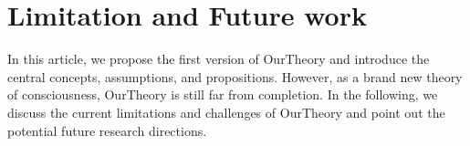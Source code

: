 \documentclass[utf8]{article}
\begin{document}
		
		
		





    \section{Limitation and Future work}\label{sec:Limitation and Future work}  
        In this article, we propose the first version of \ac{OurTheory} and introduce the central concepts, assumptions, and propositions. However, as a brand new theory of consciousness, \ac{OurTheory} is still far from completion. In the following, we discuss the current limitations and challenges of \ac{OurTheory} and point out the potential future research directions.
    
\end{document}

